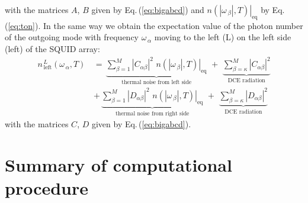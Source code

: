 %
with the matrices $A$, $B$ given by Eq.\,(\ref{eq:bigabcd}) and 
$\left. n(|\omega_{\,\beta}|, T) \right|_{\text{eq}}$ by Eq.\,(\ref{eq:ton}). 
In the same way we obtain the
expectation value of the photon number of the outgoing mode with frequency 
$\omega_{\,\alpha}$ moving to the left (L) on the left side (left) of the SQUID array:
%
\begin{equation} \label{eq:dce_left}
\begin{split}
n_{\,\text{left}}^{\,L}(\omega_{\,\alpha}, T) \, & = \,
\underbrace{\sum\limits_{\beta=1}^{M} \left|C_{\alpha \beta}\right|^2 \, \,
\left. n(|\omega_{\,\beta}|, T) \right|_{\text{eq}}}_{\text{thermal noise from left side}}
\, \, + \, \,
\underbrace{\sum\limits_{\beta=\kappa}^{M} \left|C_{\alpha \beta}\right|^2}_{\text{DCE radiation}} \\[4mm]
& + \, \underbrace{\sum\limits_{\beta=1}^{M} \left|D_{\alpha \beta}\right|^2 \, \,
\left. n(|\omega_{\,\beta}|, T) \right|_{\text{eq}}}_{\text{thermal noise from right side}}
\, \, + \, \,
\underbrace{\sum\limits_{\beta=\kappa}^{M} \left|D_{\alpha \beta}\right|^2}_{\text{DCE radiation}}
\end{split}
\end{equation}
%
with the matrices $C$, $D$ given by Eq.\,(\ref{eq:bigabcd}). 



\section{Summary of computational procedure}
\label{sec:summary}

